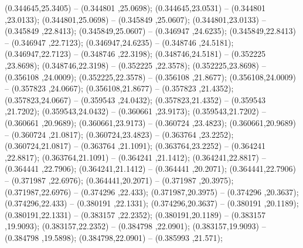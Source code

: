  (0.344645,25.3405) -- (0.344801 ,25.0698);
 (0.344645,23.0531) -- (0.344801 ,23.0133);
 (0.344801,25.0698) -- (0.345849 ,25.0607);
 (0.344801,23.0133) -- (0.345849 ,22.8413);
 (0.345849,25.0607) -- (0.346947 ,24.6235);
 (0.345849,22.8413) -- (0.346947 ,22.7123);
 (0.346947,24.6235) -- (0.348746 ,24.5181);
 (0.346947,22.7123) -- (0.348746 ,22.3198);
 (0.348746,24.5181) -- (0.352225 ,23.8698);
 (0.348746,22.3198) -- (0.352225 ,22.3578);
 (0.352225,23.8698) -- (0.356108 ,24.0009);
 (0.352225,22.3578) -- (0.356108 ,21.8677);
 (0.356108,24.0009) -- (0.357823 ,24.0667);
 (0.356108,21.8677) -- (0.357823 ,21.4352);
 (0.357823,24.0667) -- (0.359543 ,24.0432);
 (0.357823,21.4352) -- (0.359543 ,21.7202);
 (0.359543,24.0432) -- (0.360661 ,23.9173);
 (0.359543,21.7202) -- (0.360661 ,20.9689);
 (0.360661,23.9173) -- (0.360724 ,23.4823);
 (0.360661,20.9689) -- (0.360724 ,21.0817);
 (0.360724,23.4823) -- (0.363764 ,23.2252);
 (0.360724,21.0817) -- (0.363764 ,21.1091);
 (0.363764,23.2252) -- (0.364241 ,22.8817);
 (0.363764,21.1091) -- (0.364241 ,21.1412);
 (0.364241,22.8817) -- (0.364441 ,22.7906);
 (0.364241,21.1412) -- (0.364441 ,20.2071);
 (0.364441,22.7906) -- (0.371987 ,22.6976);
 (0.364441,20.2071) -- (0.371987 ,20.3975);
 (0.371987,22.6976) -- (0.374296 ,22.433);
 (0.371987,20.3975) -- (0.374296 ,20.3637);
 (0.374296,22.433) -- (0.380191 ,22.1331);
 (0.374296,20.3637) -- (0.380191 ,20.1189);
 (0.380191,22.1331) -- (0.383157 ,22.2352);
 (0.380191,20.1189) -- (0.383157 ,19.9093);
 (0.383157,22.2352) -- (0.384798 ,22.0901);
 (0.383157,19.9093) -- (0.384798 ,19.5898);
 (0.384798,22.0901) -- (0.385993 ,21.571);
